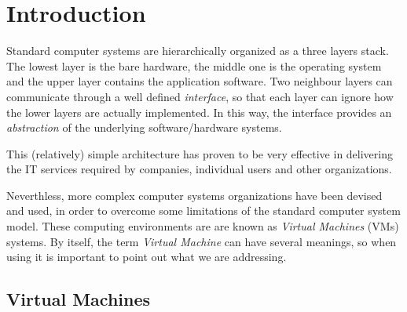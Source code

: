\chapter{Introduction}

Standard computer systems are hierarchically organized as a three
layers stack. The lowest layer is the bare hardware, the middle one is the operating system and the 
upper layer contains the application software.
Two neighbour layers can communicate through a well defined \emph{interface}, so that each layer can ignore how the
lower layers are actually implemented. In this way, the interface provides an \emph{abstraction} of the underlying software/hardware
systems.

This (relatively) simple architecture has proven to be very effective in delivering the IT services required
by companies, individual users and other organizations.

Neverthless, more complex computer systems organizations have been devised and used, in order to overcome some limitations
of the standard computer system model. These computing environments are are known as \emph{Virtual Machines} (VMs) systems.
By itself, the term \emph{Virtual Machine} can have several meanings, so when using it is important to point out what we are
addressing.


\section{Virtual Machines}




